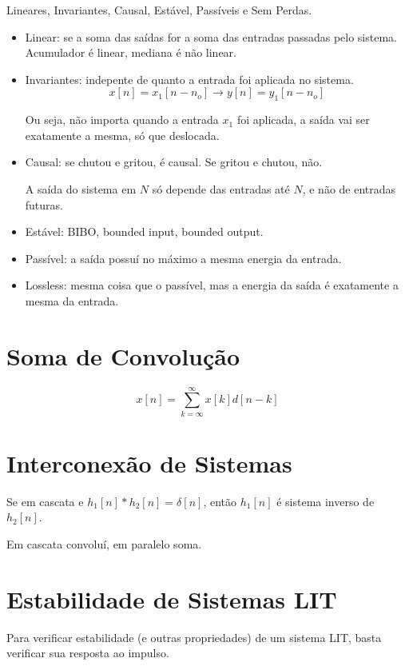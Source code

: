 Lineares, Invariantes, Causal, Estável, Passíveis e Sem Perdas.

\begin{itemize}
    \item Linear: se a soma das saídas for a soma das entradas passadas pelo sistema. Acumulador é linear, mediana é não linear.
    \item Invariantes: indepente de quanto a entrada foi aplicada no sistema.
    \[x[n] = x_{1}[n - n_{o}] \rightarrow y[n] = y_{1}[n - n_{o}]\]

    Ou seja, não importa quando a entrada $x_{1}$ foi aplicada, a saída vai ser exatamente a mesma, só que deslocada.

    \item Causal: se chutou e gritou, é causal. Se gritou e chutou, não.
    
    A saída do sistema em $N$ só depende das entradas até $N$, e não de entradas futuras.

    \item Estável: BIBO, bounded input, bounded output.
    
    \item Passível: a saída possuí no máximo a mesma energia da entrada.
    
    \item Lossless: mesma coisa que o passível, mas a energia da saída é exatamente a mesma da entrada.
\end{itemize}

\section{Soma de Convolução}

\[x[n] = \sum_{k = \infty}^{\infty} x[k]d[n - k] \]

\section{Interconexão de Sistemas}

Se em cascata e $h_{1}[n] * h_{2}[n] = \delta[n]$, então $h_{1}[n]$ é sistema inverso de $h_{2}[n]$.

Em cascata convoluí, em paralelo soma.

\section{Estabilidade de Sistemas LIT}
Para verificar estabilidade (e outras propriedades) de um sistema LIT, basta verificar sua resposta ao impulso.

